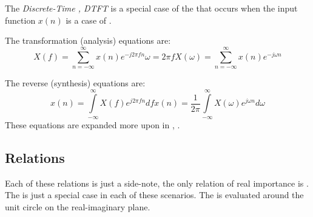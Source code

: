\begin{definition}\label{def:Discrete-Time_Fourier_Transform}
  The \emph{Discrete-Time , DTFT} is a special case of the  that occurs when the input function $x(n)$ is a case of .

  The transformation (analysis) equations are:
  \begin{subequations}
    \begin{equation}\label{eq:Discrete-Time_Fourier_Transform-Discrete-Frequency}
      X(f) = \sum\limits_{n=-\infty}^{\infty} x(n) e^{-j 2 \pi f n}
    \end{equation}
    \begin{equation*}
      \omega = 2 \pi f
    \end{equation*}
    \begin{equation}\label{eq:FourierTransform-Discrete-Omega}
      X(\omega) = \sum\limits_{n=-\infty}^{\infty} x(n) e^{-j \omega n}
    \end{equation}
  \end{subequations}

  The reverse (synthesis) equations are:
  \begin{subequations}
    \begin{equation}\label{eq:InverseFourierTransform-Frequency}
      x(n) = \int\limits_{-\infty}^{\infty} X(f) e^{j 2\pi fn} df
    \end{equation}
    \begin{equation}\label{eq:InverseFourierTransform-Omega}
      x(n) = \frac{1}{2\pi} \int\limits_{-\infty}^{\infty} X(\omega) e^{j \omega n} d\omega
    \end{equation}
  \end{subequations}
  These equations are expanded more upon in , .
\end{definition}

\subsection{ Relations}\label{subsec:Fourier_Transform_Relations}
Each of these relations is just a side-note, the only relation of real importance is .
The  is just a special case in each of these scenarios.
The  is evaluated around the unit circle on the real-imaginary plane.

